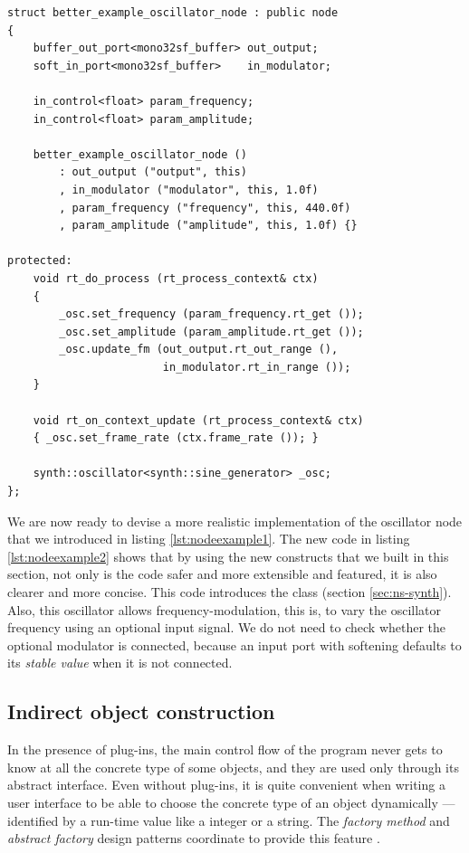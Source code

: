 \begin{lstlisting}[float=h!,caption=The oscillator node implemented
  using components,label=lst:nodeexample2]
struct better_example_oscillator_node : public node
{
    buffer_out_port<mono32sf_buffer> out_output;
    soft_in_port<mono32sf_buffer>    in_modulator;
    
    in_control<float> param_frequency;
    in_control<float> param_amplitude;

    better_example_oscillator_node ()
        : out_output ("output", this)
        , in_modulator ("modulator", this, 1.0f)
        , param_frequency ("frequency", this, 440.0f)
        , param_amplitude ("amplitude", this, 1.0f) {}

protected:
    void rt_do_process (rt_process_context& ctx)
    {
        _osc.set_frequency (param_frequency.rt_get ());
        _osc.set_amplitude (param_amplitude.rt_get ());
        _osc.update_fm (out_output.rt_out_range (),
                        in_modulator.rt_in_range ());
    }

    void rt_on_context_update (rt_process_context& ctx)
    { _osc.set_frame_rate (ctx.frame_rate ()); }

    synth::oscillator<synth::sine_generator> _osc;
};
\end{lstlisting}

We are now ready to devise a more realistic implementation of the
oscillator node that we introduced in listing
\ref{lst:nodeexample1}. The new code in listing \ref{lst:nodeexample2}
shows that by using the new constructs that we built in this section,
not only is the code safer and more extensible and featured, it is
also clearer and more concise. This code introduces the
 class (section \ref{sec:ns-synth}). Also,
this oscillator allows frequency-modulation, this is, to vary the
oscillator frequency using an optional input signal. We do not need to
check whether the optional modulator is connected, because an input
port with softening defaults to its \emph{stable value} when it is
not connected.

\subsection{Indirect object construction}
\label{sec:graphfactory}

In the presence of plug-ins, the main
control flow of the program never gets to know at all the concrete
type of some objects, and they are used only through its abstract
interface. Even without plug-ins, it is quite convenient when writing
a user interface to be able to choose the concrete type of an object
dynamically --- identified by a run-time value like a integer or a
string. The \emph{factory method} and \emph{abstract factory} design
patterns coordinate to provide this feature \cite{gamma95design,
  vlissides98pattern}.

